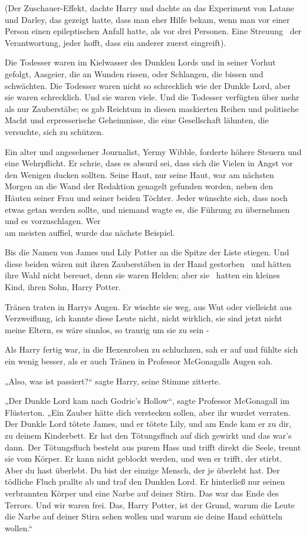 {(Der Zuschauer-Effekt, dachte Harry und dachte an das Experiment von Latane und Darley, das gezeigt hatte, dass man eher Hilfe bekam, wenn man vor einer Person einen epileptischen Anfall hatte, als vor drei Personen. Eine Streuung ~der Verantwortung, jeder hofft, dass ein anderer zuerst eingreift).

Die Todesser waren im Kielwasser des Dunklen Lords und in seiner Vorhut gefolgt, Aasgeier, die an Wunden rissen, oder Schlangen, die bissen und schwächten. Die Todesser waren nicht so schrecklich wie der Dunkle Lord, aber sie waren schrecklich. Und sie waren viele. Und die Todesser verfügten über mehr als nur Zauberstäbe; es gab Reichtum in diesen maskierten Reihen und politische Macht und erpresserische Geheimnisse, die eine Gesellschaft lähmten, die versuchte, sich zu schützen.

Ein alter und angesehener Journalist, Yermy Wibble, forderte höhere Steuern und eine Wehrpflicht. Er schrie, dass es absurd sei, dass sich die Vielen in Angst vor den Wenigen ducken sollten. Seine Haut, nur seine Haut, war am nächsten Morgen an die Wand der Redaktion genagelt gefunden worden, neben den Häuten seiner Frau und seiner beiden Töchter. Jeder wünschte sich, dass noch etwas getan werden sollte, und niemand wagte es, die Führung zu übernehmen und es vorzuschlagen. Wer\\ am meisten auffiel, wurde das nächste Beispiel.

Bis die Namen von James und Lily Potter an die Spitze der Liste stiegen. Und diese beiden wären mit ihren Zauberstäben in der Hand gestorben ~und hätten ihre Wahl nicht bereuet, denn sie waren Helden; aber sie ~hatten ein kleines Kind, ihren Sohn, Harry Potter.

Tränen traten in Harrys Augen. Er wischte sie weg, aus Wut oder vielleicht aus Verzweiflung, ich kannte diese Leute nicht, nicht wirklich, sie sind jetzt nicht meine Eltern, es wäre sinnlos, so traurig um sie zu sein -

Als Harry fertig war, in die Hexenroben zu schluchzen, sah er auf und fühlte sich ein wenig besser, als er auch Tränen in Professor McGonagalls Augen sah.

„Also, was ist passiert?“ sagte Harry, seine Stimme zitterte.

„Der Dunkle Lord kam nach Godric's Hollow“, sagte Professor McGonagall im Flüsterton. „Ein Zauber hätte dich verstecken sollen, aber ihr wurdet verraten. Der Dunkle Lord tötete James, und er tötete Lily, und am Ende kam er zu dir, zu deinem Kinderbett. Er hat den Tötungsfluch auf dich gewirkt und das war's dann. Der Tötungsfluch besteht aus purem Hass und trifft direkt die Seele, trennt sie vom Körper. Er kann nicht geblockt werden, und wen er trifft, der stirbt. Aber du hast überlebt. Du bist der einzige Mensch, der je überlebt hat. Der tödliche Fluch prallte ab und traf den Dunklen Lord. Er hinterließ nur seinen verbrannten Körper und eine Narbe auf deiner Stirn. Das war das Ende des Terrors. Und wir waren frei. Das, Harry Potter, ist der Grund, warum die Leute die Narbe auf deiner Stirn sehen wollen und warum sie deine Hand schütteln wollen.“

}

